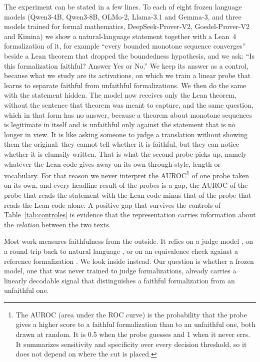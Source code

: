 \documentclass[10pt]{article}
\begin{document}
The experiment can be stated in a few lines. To each of eight frozen language models (Qwen3-4B, Qwen3-8B, OLMo-2,
Llama-3.1 and Gemma-3, and three models trained for formal mathematics, DeepSeek-Prover-V2, Goedel-Prover-V2 and
Kimina) we show a natural-language statement together with a Lean~4 formalization of it, for example ``every bounded
monotone sequence converges'' beside a Lean theorem that dropped the boundedness hypothesis, and we ask: ``Is this
formalization faithful? Answer Yes or No.'' We keep its answer as a control, because what we study are its
activations, on which we train a linear probe that learns to separate faithful from unfaithful formalizations. We then
do the same with the statement hidden. The model now receives only the Lean theorem, without the sentence that theorem
was meant to capture, and the same question, which in that form has no answer, because a theorem about monotone
sequences is legitimate in itself and is unfaithful only against the statement that is no longer in view. It is like
asking someone to judge a translation without showing them the original: they cannot tell whether it is faithful, but
they can notice whether it is clumsily written. That is what the second probe picks up, namely whatever the Lean code
gives away on its own through style, length or vocabulary. For that reason we never interpret the AUROC\footnote{The
AUROC (area under the ROC curve) is the probability that the probe gives a higher score to a faithful formalization
than to an unfaithful one, both drawn at random. It is 0.5 when the probe guesses and 1 when it never errs. It
summarizes sensitivity and specificity over every decision threshold, so it does not depend on where the cut is
placed.} of one probe taken on its own, and every headline result of the probes is a gap, the AUROC of the probe that
reads the statement with the Lean code minus that of the probe that reads the Lean code alone. A positive gap that
survives the controls of Table~\ref{tab:controles} is evidence that the representation carries information about the
\emph{relation} between the two texts.

Most work measures faithfulness from the outside. It relies on a judge model
\citep{criticlean,formalalign,zhang2026beyondcompilation,wang2026formalrx}, on a round trip back to natural language
\citep{amrollahi2026roundtrip}, or on an equivalence check against a reference formalization
\citep{proofnetverif,mohammad2026faithfulnessgap}. We look inside instead. Our question is whether a frozen model,
one that was never trained to judge formalizations, already carries a linearly decodable signal that distinguishes a
faithful formalization from an unfaithful one.
\end{document}
